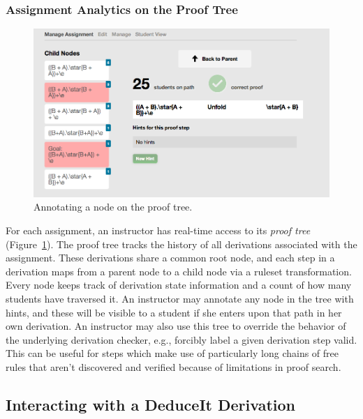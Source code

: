 \documentclass{sigchi}
\begin{document}
\subsubsection{Assignment Analytics on the Proof Tree}
\begin{figure}[tb]
\centering
\includegraphics[width=1\columnwidth]{nodeannote}
\caption{Annotating a node on the proof tree.}
\label{fig:nodeannote}
\end{figure}

For each assignment, an instructor has real-time access to its \emph{proof tree} (Figure~\ref{fig:nodeannote}). The proof tree tracks the history of all derivations associated with the assignment. These derivations share a common root node, and each step in a derivation maps from a parent node to a child node via a ruleset transformation. Every node keeps track of derivation state information and a count of how many students have traversed it. An instructor may annotate any node in the tree with hints, and these will be visible to a student if she enters upon that path in her own derivation. An instructor may also use this tree to override the behavior of the underlying derivation checker, e.g., forcibly label a given derivation step valid. This can be useful for steps which make use of particularly long chains of free rules that aren't discovered and verified because of limitations in proof search. %


\subsection{Interacting with a DeduceIt Derivation}
\end{document}

